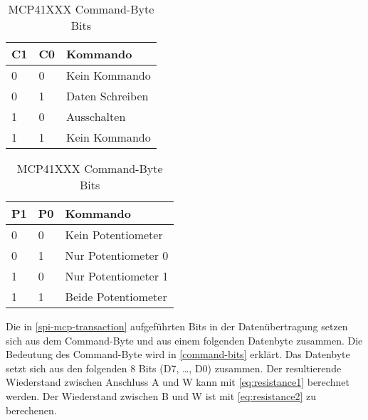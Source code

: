 \begin{table}
    \centering
    \begin{subtable}[t]{5cm}
        \centering
        \begin{tabular}{|l|l|l|}
            \hline
            \textbf{C1} & \textbf{C0} & \textbf{Kommando} \\
            \hline
            \hline
            0 & 0 & Kein Kommando \\
            \hline
            0 & 1 & Daten Schreiben \\
            \hline
            1 & 0 & Ausschalten \\
            \hline
            1 & 1 & Kein Kommando \\
            \hline
        \end{tabular}
        \caption{Kommando Bits}\label{command:1a}
    \end{subtable}
    \quad
    \begin{subtable}[t]{5cm}
        \centering
        \begin{tabular}{|l|l|l|}
            \hline
            \textbf{P1} & \textbf{P0} & \textbf{Kommando} \\
            \hline
            \hline
            0 & 0 & Kein Potentiometer \\
            \hline
            0 & 1 & Nur Potentiometer 0 \\
            \hline
            1 & 0 & Nur Potentiometer 1 \\
            \hline
            1 & 1 & Beide Potentiometer \\
            \hline
        \end{tabular}
        \caption{Potentiometer bits}\label{command:1b}
    \end{subtable}
    \caption{MCP41XXX Command-Byte Bits}
    \label{command-bits}
\end{table}

Die in \autoref{spi-mcp-transaction} aufgeführten Bits in der Datenübertragung setzen sich aus dem Command-Byte und aus einem folgenden Datenbyte zusammen.
Die Bedeutung des Command-Byte wird in \autoref{command-bits} erklärt.
Das Datenbyte setzt sich aus den folgenden 8 Bits (D7, \ldots, D0) zusammen.
Der resultierende Wiederstand zwischen Anschluss A und W kann mit \autoref{eq:resistance1} berechnet werden.
Der Wiederstand zwischen B und W ist mit \autoref{eq:resistance2} zu berechenen.

